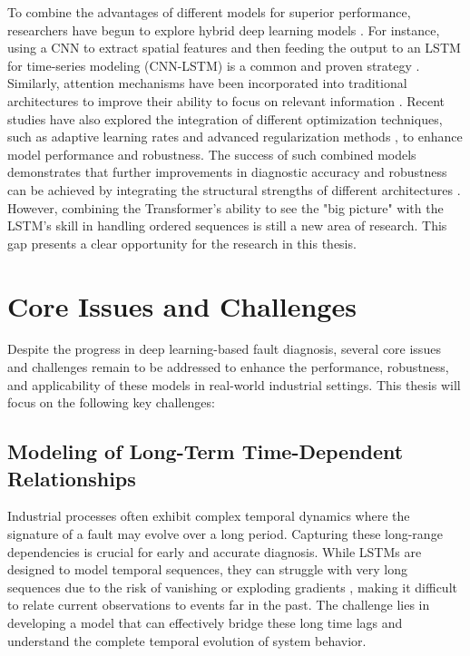 To combine the advantages of different models for superior performance, researchers have begun to explore hybrid deep learning models \cite{zhao2019deep, lei2020applications}. For instance, using a CNN to extract spatial features and then feeding the output to an LSTM for time-series modeling (CNN-LSTM) is a common and proven strategy \cite{khan2018review, zhao2019deep}. Similarly, attention mechanisms have been incorporated into traditional architectures to improve their ability to focus on relevant information \cite{bahdanau2015neural}. Recent studies have also explored the integration of different optimization techniques, such as adaptive learning rates \cite{kingma2014adam, loshchilov2019decoupled} and advanced regularization methods \cite{srivastava2014dropout}, to enhance model performance and robustness. The success of such combined models demonstrates that further improvements in diagnostic accuracy and robustness can be achieved by integrating the structural strengths of different architectures \cite{lei2020applications, khan2018review}. However, combining the Transformer's ability to see the "big picture" with the LSTM's skill in handling ordered sequences is still a new area of research. This gap presents a clear opportunity for the research in this thesis.




\section{Core Issues and Challenges}
\label{sec:introduction:issues_challenges}

Despite the progress in deep learning-based fault diagnosis, several core issues and challenges remain to be addressed to enhance the performance, robustness, and applicability of these models in real-world industrial settings. This thesis will focus on the following key challenges:

\subsection{Modeling of Long-Term Time-Dependent Relationships}
Industrial processes often exhibit complex temporal dynamics where the signature of a fault may evolve over a long period. Capturing these long-range dependencies is crucial for early and accurate diagnosis. While LSTMs are designed to model temporal sequences, they can struggle with very long sequences due to the risk of vanishing or exploding gradients \cite{pascanu2013difficulty}, making it difficult to relate current observations to events far in the past. The challenge lies in developing a model that can effectively bridge these long time lags and understand the complete temporal evolution of system behavior.

